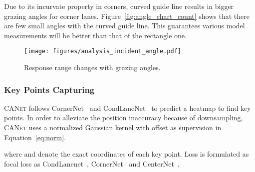 \documentclass{article}
\newcommand\self{\textsc{CANet}\xspace}
\begin{document}
Due to its incurvate property in corners, curved guide line results in bigger
grazing angles for corner lanes. Figure~\ref{fig:angle_chart_count} shows that
there are few small angles with the curved guide line. This guarantees various
model measurements will be better than that of the rectangle one.

\begin{figure}
  \centering
  \texttt{[image: figures/analysis\_incident\_angle.pdf]}
  \caption{Response range changes with grazing angles.}
  \label{fig:analysis_grazing_angle}
\end{figure}

\subsubsection{Key Points Capturing}
\label{sec:keypoints-catching}
\self follows CornerNet~\cite{cornernet} and CondLaneNet~\cite{condlanenet} to
predict a heatmap to find key points. In order to alleviate the position
inaccuracy because of downsampling, \self uses a normalized Gaussian kernel with
offset as supervision in Equation~\eqref{eq:norm}.

where  and  denote the exact coordinates of each key point. Loss is
formulated as focal loss as
CondLanenet~\cite{condlanenet}, CornerNet~\cite{cornernet} and
CenterNet~\cite{centernet}.
\end{document}
